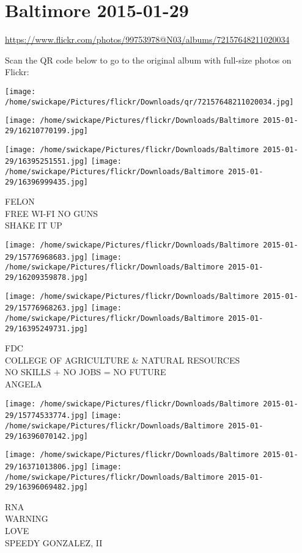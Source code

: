 \documentclass[10pt,letterpaper]{article}
\title{}
\author{}
\date{}
\begin{document}
\section*{Baltimore 2015-01-29}

\url{https://www.flickr.com/photos/99753978@N03/albums/72157648211020034}

Scan the QR code below to go to the original album with full-size photos on Flickr:

\texttt{[image: /home/swickape/Pictures/flickr/Downloads/qr/72157648211020034.jpg]}
\pagebreak

\texttt{[image: /home/swickape/Pictures/flickr/Downloads/Baltimore 2015-01-29/16210770199.jpg]}

\vspace{0.25in}
\texttt{[image: /home/swickape/Pictures/flickr/Downloads/Baltimore 2015-01-29/16395251551.jpg]}
\texttt{[image: /home/swickape/Pictures/flickr/Downloads/Baltimore 2015-01-29/16396999435.jpg]}

FELON\\
FREE WI{-}FI NO GUNS\\
SHAKE IT UP
\pagebreak

\texttt{[image: /home/swickape/Pictures/flickr/Downloads/Baltimore 2015-01-29/15776968683.jpg]}
\texttt{[image: /home/swickape/Pictures/flickr/Downloads/Baltimore 2015-01-29/16209359878.jpg]}

\texttt{[image: /home/swickape/Pictures/flickr/Downloads/Baltimore 2015-01-29/15776968263.jpg]}
\texttt{[image: /home/swickape/Pictures/flickr/Downloads/Baltimore 2015-01-29/16395249731.jpg]}

FDC\\
COLLEGE OF AGRICULTURE \& NATURAL RESOURCES\\
NO SKILLS + NO JOBS = NO FUTURE\\
ANGELA
\pagebreak

\texttt{[image: /home/swickape/Pictures/flickr/Downloads/Baltimore 2015-01-29/15774533774.jpg]}
\texttt{[image: /home/swickape/Pictures/flickr/Downloads/Baltimore 2015-01-29/16396070142.jpg]}

\texttt{[image: /home/swickape/Pictures/flickr/Downloads/Baltimore 2015-01-29/16371013806.jpg]}
\texttt{[image: /home/swickape/Pictures/flickr/Downloads/Baltimore 2015-01-29/16396069482.jpg]}

RNA\\
WARNING\\
LOVE\\
SPEEDY GONZALEZ, II
\pagebreak
\end{document}
